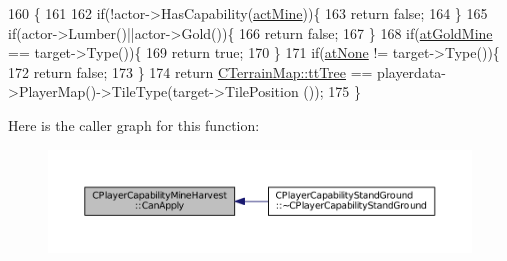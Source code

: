 \begin{DoxyCode}
160                                                                                                            
                                                        \{
161     
162     \textcolor{keywordflow}{if}(!actor->HasCapability(\hyperlink{GameDataTypes_8h_a35b98ce26aca678b03c6f9f76e4778cea2e0db284fd05caa56e3867c661ccdd8b}{actMine}))\{
163         \textcolor{keywordflow}{return} \textcolor{keyword}{false};
164     \}
165     \textcolor{keywordflow}{if}(actor->Lumber()||actor->Gold())\{
166         \textcolor{keywordflow}{return} \textcolor{keyword}{false};
167     \}
168     \textcolor{keywordflow}{if}(\hyperlink{GameDataTypes_8h_a5600d4fc433b83300308921974477feca243d9ba44092eadd561db058d742b3b3}{atGoldMine} == target->Type())\{
169         \textcolor{keywordflow}{return} \textcolor{keyword}{true};
170     \}
171     \textcolor{keywordflow}{if}(\hyperlink{GameDataTypes_8h_a5600d4fc433b83300308921974477feca82fb51718e2c00981a2d37bc6fe92593}{atNone} != target->Type())\{
172         \textcolor{keywordflow}{return} \textcolor{keyword}{false};
173     \}
174     \textcolor{keywordflow}{return} \hyperlink{classCTerrainMap_aff2ab991e237269941416dd79d8871d4a15600fc22dc08ff5a3aec20930112f8c}{CTerrainMap::ttTree} == playerdata->PlayerMap()->TileType(target->TilePosition
      ());
175 \}
\end{DoxyCode}
Here is the caller graph for this function\+:\nopagebreak
\begin{figure}[H]
\begin{center}
\leavevmode
\includegraphics[width=350pt]{classCPlayerCapabilityMineHarvest_a31da799cc9bc9be9f986bd878d13283a_icgraph}
\end{center}
\end{figure}
\hypertarget{classCPlayerCapabilityMineHarvest_a37944eb249559f1246348b47e3f24dee}{}\label{classCPlayerCapabilityMineHarvest_a37944eb249559f1246348b47e3f24dee} 
